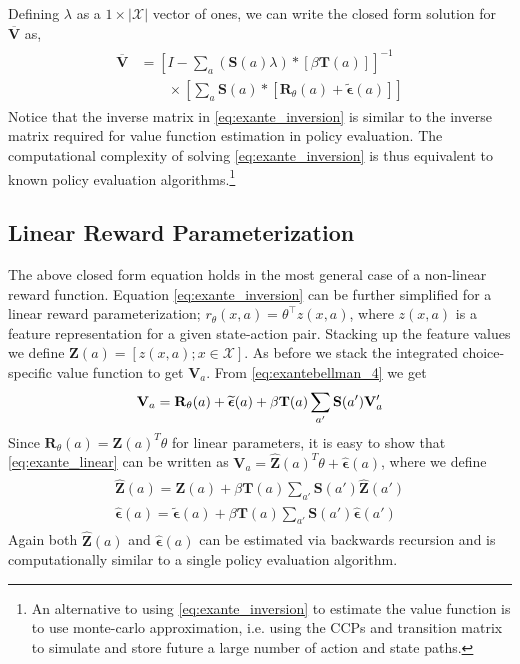 \documentclass{article}
\renewcommand{\vec}[1]{\mbox{\bm{$#1$}}}
\begin{document}
Defining $\lambda$ as a $1\times|\mathcal{X}|$ vector of ones, we can write the closed form solution for $\overline{\mathbf{V}}$ as,
\begin{align} \label{eq:exante_inversion}
\begin{split}
\overline{\mathbf{V}} &=\left[I-\sum_{a}(\mathbf{S}(a) \lambda) *\left[ \beta \mathbf{T}(a)  \right]\right]^{-1} \\
& \qquad \times \left[\sum_{a}\mathbf{S}(a) *\left[ \mathbf{R}_{\theta}(a)+\tilde{\bm{\epsilon}}(a)\right]\right]
\end{split}
\end{align}
Notice that the inverse matrix in \eqref{eq:exante_inversion} is similar to the inverse matrix required for value function estimation in policy evaluation. The computational complexity of solving \eqref{eq:exante_inversion} is thus equivalent to known policy evaluation algorithms.\footnote{An alternative to using \ref{eq:exante_inversion} to estimate the value function is to use monte-carlo approximation, i.e. using the CCPs and transition matrix to simulate and store future a large number of action and state paths.}

\subsection{Linear Reward Parameterization}

The above closed form equation holds in the most general case of a non-linear reward function. Equation \eqref{eq:exante_inversion} can be further simplified for a linear reward parameterization; $r_{\theta}(x,a) = \theta^{\top} z(x,a)$, where $z(x, a)$ is a feature representation for a given state-action pair. Stacking up the feature values we define $\mathbf{Z}(a) = [z(x, a); x \in \mathcal{X}]$. As before we stack the integrated choice-specific value function to get $\mathbf{V}_a$. From \eqref{eq:exantebellman_4} we get
\begin{align} \label{eq:exante_linear}
    \begin{split}
    \mathbf{V}_a=\mathbf{R}_{\theta}(a)+\widetilde{\vec{\epsilon}}(a)+\beta \mathbf{T}(a) \sum_{a'}\mathbf{S}(a')\mathbf{V}_a'
    \end{split}
\end{align}
Since $\mathbf{R}_{\theta}(a) = \mathbf{Z}(a)^T\theta$ for linear parameters, it is easy to show that \eqref{eq:exante_linear} can be written as $\mathbf{V}_a = \hat{\mathbf{Z}}(a)^T\theta + \hat{\bm{\epsilon}}(a)$, where we define
\begin{align} \label{eq:choice_specific_Z_tilde}
\begin{split}
    \hat{\mathbf{Z}}(a) = \mathbf{Z}(a) + \beta\mathbf{T}(a)\sum_{a'}\mathbf{S}(a')\hat{\mathbf{Z}}(a') \\
    \hat{\bm{\epsilon}}(a) = \tilde{\bm{\epsilon}}(a) + \beta\mathbf{T}(a)\sum_{a'}\mathbf{S}(a')\hat{\bm{\epsilon}}(a')
\end{split}    
\end{align}
Again both $\hat{\mathbf{Z}}(a)$ and $\hat{\bm{\epsilon}}(a)$ can be estimated via backwards recursion and is computationally similar to a single policy evaluation algorithm.
\end{document}
